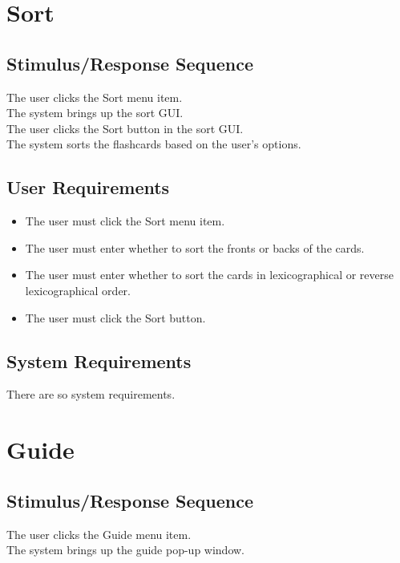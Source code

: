 \documentclass{scrreprt}
\newcommand{\smallspace}{\vspace{0.5cm}}
\begin{document}
\section{Sort}
    \subsection{Stimulus/Response Sequence}
        \begin{flushleft}
             The user clicks the Sort menu item. \\
             The system brings up the sort GUI. \\
            \smallspace
             The user clicks the Sort button in the sort GUI. \\
             The system sorts the flashcards based on the user's options. \\
        \end{flushleft}
    \subsection{User Requirements}
        \begin{itemize}
            \item The user must click the Sort menu item.
            \item The user must enter whether to sort the fronts or backs of the cards.
            \item The user must enter whether to sort the cards in lexicographical or reverse lexicographical order.
            \item The user must click the Sort button.
        \end{itemize} 

    \subsection{System Requirements}
        There are so system requirements. 

\section{Guide}
    \subsection{Stimulus/Response Sequence}
        \begin{flushleft}
             The user clicks the Guide menu item. \\
             The system brings up the guide pop-up window. \\
        \end{flushleft}
\end{document}
